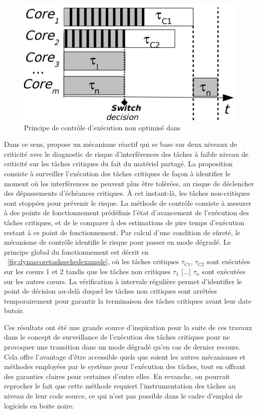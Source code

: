 \documentclass[french, a4paper, 11pt, twoside, pdftex]{StyleThese}
\begin{document}
    \begin{figure}[ht!]
    	\centering
    	\includegraphics[width=0.7\linewidth]{schemas/DYNASCORE_tasks_sched_example}
    	\caption{Principe de contrôle d'exécution non optimisé dans \cite{kritikakou_multiplexing_2016}}
    	\label{fig:dynascoretasksschedexample}
    \end{figure}
    Dans ce sens, \cite{kritikakou_dynascore_2017} propose un mécanisme réactif qui se base sur deux niveaux de criticité avec le diagnostic de risque d'interférences des tâches à faible niveau de criticité sur les tâches critiques du fait du matériel partagé. La proposition consiste à surveiller l'exécution des tâches critiques de façon à identifier le moment où les interférences ne peuvent plus être tolérées, au risque de déclencher des dépassements d'échéances critiques. À cet instant-là, les tâches non-critiques sont stoppées pour prévenir le risque. La méthode de contrôle consiste à mesurer à des points de fonctionnement prédéfinis l'état d'avancement de l'exécution des tâches critiques, et de le comparer à des estimations de pire temps d'exécution restant à ce point de fonctionnement. Par calcul d'une condition de sûreté, le mécanisme de contrôle identifie le risque  pour passer en mode dégradé. Le principe global du fonctionnement est décrit en ~\autoref{fig:dynascoretasksschedexample}, où les tâches critiques $\tau_{C1}$, $\tau_{C2}$ sont exécutées sur les cœurs 1 et 2 tandis que les tâches non critiques $\tau_{1}$ [...] $\tau_{n}$ sont exécutées sur les autres cœurs. La vérification à intervale régulière permet d'identifier le point de décision au-delà duquel les tâches non critiques sont arrêtées temporairement pour garantir la terminaison des tâches critiques avant leur date butoir.
    

    
    Ces résultats ont été une grande source d'inspiration pour la suite de ces travaux dans le concept de surveillance de l'exécution des tâches critiques pour ne provoquer une transition dans un mode dégradé qu'en cas de dernier recours. Cela offre l'avantage d'être accessible quels que soient les autres mécanismes et méthodes employées par le système pour l'exécution des tâches, tout en offrant des garanties claires pour certaines d'entre elles. En revanche, on pourrait reprocher le fait que cette méthode requiert l'instrumentation des tâches au niveau de leur code source, ce qui n'est pas possible dans le cadre d'emploi de logiciels en boite noire. 
\end{document}
